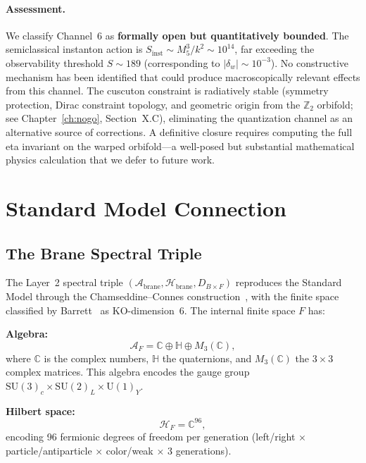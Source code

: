 \paragraph{Assessment.} We classify Channel~6 as \textbf{formally open but quantitatively bounded}. The semiclassical instanton action is $S_{\mathrm{inst}} \sim M_5^3/k^2 \sim 10^{14}$, far exceeding the observability threshold $S \sim 189$ (corresponding to $|\delta_w| \sim 10^{-3}$). No constructive mechanism has been identified that could produce macroscopically relevant effects from this channel. The cuscuton constraint is radiatively stable (symmetry protection, Dirac constraint topology, and geometric origin from the $\mathbb{Z}_2$ orbifold; see Chapter~\ref{ch:nogo}, Section~X.C), eliminating the quantization channel as an alternative source of corrections. A definitive closure requires computing the full eta invariant on the warped orbifold---a well-posed but substantial mathematical physics calculation that we defer to future work.


\section{Standard Model Connection}
\label{sec:4-sm-connection}

\subsection{The Brane Spectral Triple}
\label{sec:4-brane-triple}

The Layer~2 spectral triple $(\mathcal{A}_{\mathrm{brane}}, \mathcal{H}_{\mathrm{brane}}, D_{B \times F})$ reproduces the Standard Model through the Chamseddine--Connes construction~\cite{ch4:CC1997,ch4:CCM2007}, with the finite space classified by Barrett~\cite{ch4:Barrett2007} as KO-dimension~6. The internal finite space $F$ has:

\textbf{Algebra:}
\begin{equation}
  \mathcal{A}_F = \mathbb{C} \oplus \mathbb{H} \oplus M_3(\mathbb{C}),
  \label{eq:4-62}
\end{equation}
where $\mathbb{C}$ is the complex numbers, $\mathbb{H}$ the quaternions, and $M_3(\mathbb{C})$ the $3 \times 3$ complex matrices. This algebra encodes the gauge group $\mathrm{SU}(3)_c \times \mathrm{SU}(2)_L \times \mathrm{U}(1)_Y$.

\textbf{Hilbert space:}
\begin{equation}
  \mathcal{H}_F = \mathbb{C}^{96},
  \label{eq:4-63}
\end{equation}
encoding 96 fermionic degrees of freedom per generation (left/right $\times$ particle/antiparticle $\times$ color/weak $\times$ 3 generations).

